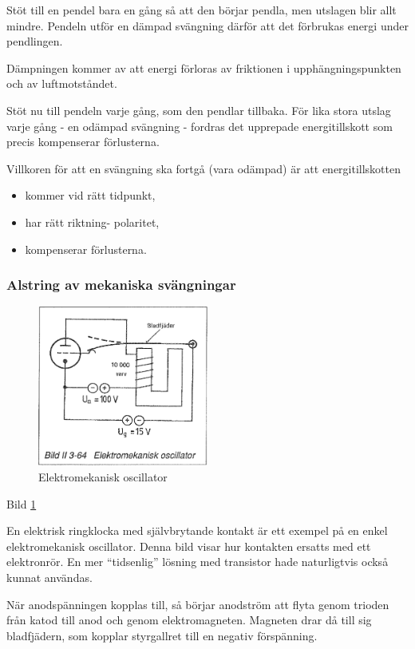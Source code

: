 Stöt till en pendel bara en gång så att den börjar pendla, men
utslagen blir allt mindre. Pendeln utför en dämpad svängning därför
att det förbrukas energi under pendlingen.

Dämpningen kommer av att energi förloras av friktionen i
upphängningspunkten och av luftmotståndet.

Stöt nu till pendeln varje gång, som den pendlar tillbaka. För lika
stora utslag varje gång - en odämpad svängning - fordras det upprepade
energitillskott som precis kompenserar förlusterna.

Villkoren för att en svängning ska fortgå (vara odämpad) är att
energitillskotten
\begin{itemize}
\item kommer vid rätt tidpunkt,
\item har rätt riktning- polaritet,
\item kompenserar förlusterna.
\end{itemize}

\subsubsection{Alstring av mekaniska svängningar}

\begin{figure}
\includegraphics[width=0.5\textwidth]{images/bild_2_3-64}
\caption{Elektromekanisk oscillator}
\label{fig:BildII3-64}
\end{figure}

Bild \ref{fig:BildII3-64}

En elektrisk ringklocka med självbrytande kontakt är ett exempel på en
enkel elektromekanisk oscillator. Denna bild visar hur kontakten
ersatts med ett elektronrör. En mer ``tidsenlig'' lösning med transistor
hade naturligtvis också kunnat användas.

När anodspänningen kopplas till, så börjar anodström att flyta genom
trioden från katod till anod och genom elektromagneten.  Magneten drar
då till sig bladfjädern, som kopplar styrgallret till en negativ
förspänning.

